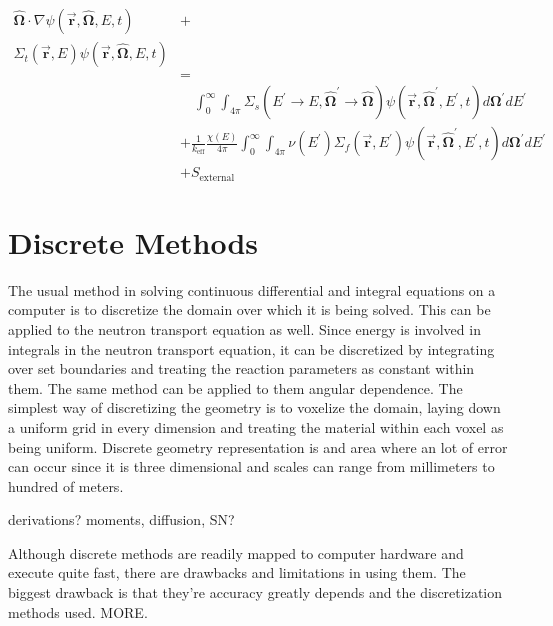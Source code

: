\begin{equation}
\label{time_ind_NTE}
\begin{split}
\boldsymbol{\hat{\Omega}}  \cdot \nabla \psi(\boldsymbol{\vec{r}},\boldsymbol{\hat{\Omega}},E,t) &+ \\
\Sigma_t(\boldsymbol{\vec{r}},E) \psi(\boldsymbol{\vec{r}},\boldsymbol{\hat{\Omega}},E,t) & \\
& =  \\
& \quad \int_0^\infty  \int_{4\pi} \Sigma_s(E^\prime \rightarrow E,\boldsymbol{\hat{\Omega}}^\prime \rightarrow \boldsymbol{\hat{\Omega}}) \psi(\boldsymbol{\vec{r}},\boldsymbol{\hat{\Omega}}^\prime,E^\prime,t) d\boldsymbol{\Omega}^\prime dE^\prime  \\
&+ \frac{1}{k_{\mathrm{eff}}}\frac{\chi(E)}{4\pi} \int_0^\infty  \int_{4\pi}   \nu(E^\prime) \Sigma_f(\boldsymbol{\vec{r}},E^\prime) \psi(\boldsymbol{\vec{r}},\boldsymbol{\hat{\Omega}}^\prime,E^\prime,t) d\boldsymbol{\Omega}^\prime  dE^\prime\\
& + S_{\mathrm{external}}
\end{split}
 \end{equation}
 

 

\section{Discrete Methods}

The usual method in solving continuous differential and integral equations on a computer is to discretize the domain over which it is being solved.  This can be applied to the neutron transport equation as well.  Since energy is involved in integrals in the neutron transport equation, it can be discretized by integrating over set boundaries and treating the reaction parameters as constant within them.  The same method can be applied to them angular dependence.   The simplest way of discretizing the geometry is to voxelize the domain, laying down a uniform grid in every dimension and treating the material within each voxel as being uniform.  Discrete geometry representation is and area where an lot of error can occur since it is three dimensional and scales can range from millimeters to hundred of meters. 

derivations?  moments, diffusion, SN?

Although discrete methods are readily mapped to computer hardware and execute quite fast, there are drawbacks and limitations in using them.  The biggest drawback is that they're accuracy greatly depends and the discretization methods used.  MORE.

